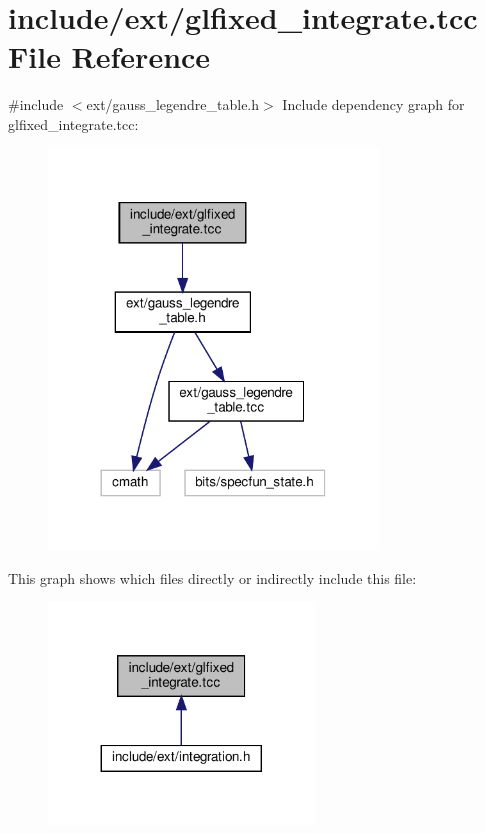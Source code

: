 \hypertarget{glfixed__integrate_8tcc}{}\section{include/ext/glfixed\+\_\+integrate.tcc File Reference}
\label{glfixed__integrate_8tcc}
{\ttfamily \#include $<$ext/gauss\+\_\+legendre\+\_\+table.\+h$>$}\newline
Include dependency graph for glfixed\+\_\+integrate.\+tcc\+:
\nopagebreak
\begin{figure}[H]
\begin{center}
\leavevmode
\includegraphics[width=248pt]{glfixed__integrate_8tcc__incl}
\end{center}
\end{figure}
This graph shows which files directly or indirectly include this file\+:
\nopagebreak
\begin{figure}[H]
\begin{center}
\leavevmode
\includegraphics[width=200pt]{glfixed__integrate_8tcc__dep__incl}
\end{center}
\end{figure}
